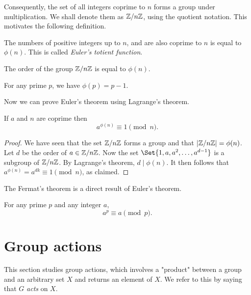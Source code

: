 \documentclass[main.tex]{subfiles}
\begin{document}
			Consequently, the set of all integers coprime to $n$ forms a group under multiplication. We shall denote them as $\mathbb Z/n\mathbb Z$, using the quotient notation. This motivates the following definition.
			\begin{definition}
				The numbers of positive integers up to $n$, and are also coprime to $n$ is equal to $\phi(n)$. This is called \textit{Euler's totient function}.
			\end{definition}
			\begin{corollary}
				The order of the group $\mathbb Z/n\mathbb Z$ is equal to $\phi(n)$.
			\end{corollary}
			\begin{lemma}
				For any prime $p$, we have $\phi(p) = p - 1$.
			\end{lemma}
			Now we can prove Euler's theorem using Lagrange's theorem.
			\begin{theorem}
				If $a$ and $n$ are coprime then
				\begin{equation*}
					a^{\phi(n)} \equiv 1 \pmod n.
				\end{equation*}
			\end{theorem}
			\begin{proof}
				We have seen that the set $\mathbb Z/n\mathbb Z$ forms a group and that $\lvert\mathbb Z/n\mathbb Z\rvert = \phi(n)$. Let $d$ be the order of $a \in \mathbb Z/n\mathbb Z$. Now the set $\Set{1, a, a^2, \ldots, a^{d-1}}$ is a subgroup of $\mathbb Z/n\mathbb Z$. By Lagrange's theorem, $d \mid \phi(n)$. It then follows that $a^{\phi(n)} = a^{dk} \equiv 1 \pmod n$, as claimed.
			\end{proof}
			The Fermat's theorem is a direct result of Euler's theorem.
			\begin{corollary}
				For any prime $p$ and any integer $a$,
				\begin{equation*}
					a^p \equiv a \pmod p.
				\end{equation*}
			\end{corollary}
		\section{Group actions}
		This section studies group actions, which involves a "product" between a group and an arbitrary set $X$ and returns an element of $X$. We refer to this by saying that $G$ \textit{acts} on $X$. 
		
\end{document}
